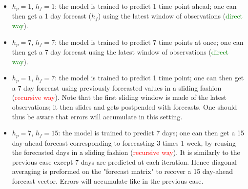 \documentclass{article}
\begin{document}
\begin{itemize}
\item $h_p=1$, $h_f=1$: the model is trained to predict 1 time point ahead; one can then get a 1 day forecast ($h_f$) using the latest window of observations (\textcolor{green}{direct way}).

\item $h_p=7$, $h_f=7$: the model is trained to predict 7 time points at once; one can then get a 7 day forecast using the latest window of observations (\textcolor{green}{direct way}).

\item $h_p=1$, $h_f=7$: the model is trained to predict 1 time point; one can then get a 7 day forecast using previously forecasted values in a sliding fashion (\textcolor{red}{recursive way}). Note that the first sliding window is made of the latest observations; it then slides and gets postpended with forecasts. One should thus be aware that errors will accumulate in this setting.

\item $h_p=7$, $h_f=15$: the model is trained to predict 7 days; one can then get a 15 day-ahead forecast corresponding to forecasting 3 times 1 week, by reusing the forecasted days in a sliding fashion (\textcolor{red}{recursive way}). It is similarly to the previous case except 7 days are predicted at each iteration. Hence diagonal averaging is preformed on the "forecast matrix" to recover a 15 day-ahead forecast vector. Errors will accumulate like in the previous case.
\end{itemize}
\end{document}
